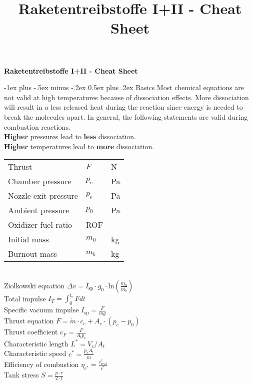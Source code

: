 \documentclass[10pt,landscape]{article}
\title{Raketentreibstoffe I+II - Cheat Sheet}
\makeatletter
\renewcommand{\section}{\@startsection{section}{1}{0mm}%
	{-1ex plus -.5ex minus -.2ex}%
	{0.5ex plus .2ex}%
	{\normalfont\large\bfseries}}
\makeatother
\begin{document}
	
	\raggedright
	\footnotesize
	
	\begin{center}
		\Large{\textbf{Raketentreibstoffe I+II - Cheat Sheet}} \\
	\end{center}
	\begin{multicols}{3}
		\setlength{\premulticols}{1pt}
		\setlength{\postmulticols}{1pt}
		\setlength{\multicolsep}{1pt}
		\setlength{\columnsep}{2pt}
		
		\section{Basics}
		Most chemical equations are not valid at high temperatures because of dissociation effects. More dissociation will result in a less released heat during the reaction since energy is needed to break the molecules apart. In general, the following statements are valid during combustion reactions.\\
		\vspace{5pt}
		\textbf{Higher} pressures lead to \textbf{less} dissociation.\\
		\textbf{Higher} temperatures lead to \textbf{more} dissociation.\\
		\vspace{7pt}
		\begin{tabular}{lll}
			Thrust & $F$ & N \\
			Chamber pressure & $p_c$ & Pa \\
			Nozzle exit pressure & $p_e$ & Pa \\
			Ambient pressure & $p_0$ & Pa \\
			Oxidizer fuel ratio & ROF & - \\
			Initial mass & $m_0$ & kg \\
			Burnout mass & $m_b$ & kg \\
		\end{tabular}\\
		\vspace{5pt}
		Ziolkowski equation $\Delta v=I_{\text{sp}}\cdot g_0 \cdot \text{ln}(\frac{m_0}{m_b})$\\
		\vspace{7pt}
		Total impulse $I_T = \int_{0}^{t_e} F dt$\\
		Specific vacuum impulse $I_{\text{sp}}=\frac{F}{\dot{m}g}$\\
		\vspace{7pt}
		Thrust equation $F=\dot{m}\cdot c_e + A_e \cdot (p_e - p_0)$\\
		Thrust coefficient $c_F = \frac{F}{A_t p_c}$\\
		\vspace{7pt}
		Characteristic length $L^*=V_c/A_t$\\
		Characteristic speed $c^*=\frac{p_cA_t}{\dot{m}}$\\
		Efficiency of combustion $\eta_{c^*} = \frac{c^*_{\text{real}}}{c^*}$\\
		\vspace{7pt}
		Tank stress $S = \frac{p \cdot r}{2 \cdot t}$
		

\end{multicols}
\end{document}
